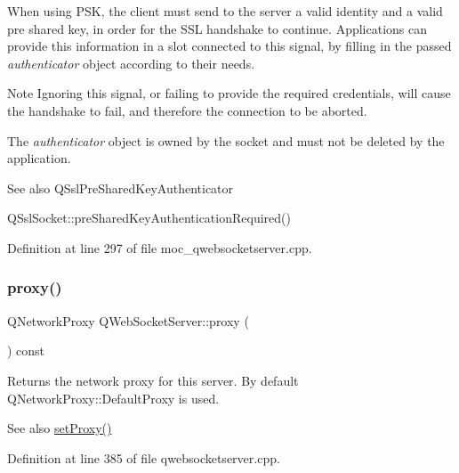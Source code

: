When using P\+SK, the client must send to the server a valid identity and a valid pre shared key, in order for the S\+SL handshake to continue. Applications can provide this information in a slot connected to this signal, by filling in the passed {\itshape authenticator} object according to their needs.

\begin{DoxyNote}{Note}
Ignoring this signal, or failing to provide the required credentials, will cause the handshake to fail, and therefore the connection to be aborted.

The {\itshape authenticator} object is owned by the socket and must not be deleted by the application.
\end{DoxyNote}
\begin{DoxySeeAlso}{See also}
Q\+Ssl\+Pre\+Shared\+Key\+Authenticator 

Q\+Ssl\+Socket\+::pre\+Shared\+Key\+Authentication\+Required() 
\end{DoxySeeAlso}


Definition at line 297 of file moc\+\_\+qwebsocketserver.\+cpp.

\mbox{\label{class_q_web_socket_server_ae7b37544dd4e6490d777ed4f5e0699ad}} 
\subsubsection{\texorpdfstring{proxy()}{proxy()}}
{\footnotesize\ttfamily Q\+Network\+Proxy Q\+Web\+Socket\+Server\+::proxy (\begin{DoxyParamCaption}{ }\end{DoxyParamCaption}) const}

Returns the network proxy for this server. By default Q\+Network\+Proxy\+::\+Default\+Proxy is used.

\begin{DoxySeeAlso}{See also}
\mbox{\hyperlink{class_q_web_socket_server_a56705b340b945790676ddebe8225c65e}{set\+Proxy()}} 
\end{DoxySeeAlso}


Definition at line 385 of file qwebsocketserver.\+cpp.

\mbox{\label{class_q_web_socket_server_abd60e2bf5ca8e58e15ff3ac061af85ba}} 
